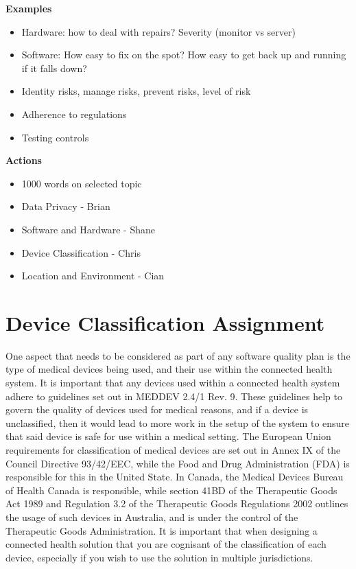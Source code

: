 \textbf{Examples}
\begin{itemize}
\item Hardware: how to deal with repairs? Severity (monitor vs server)
\item Software: How easy to fix on the spot? How easy to get back up and running if it falls down?
\item Identity risks, manage risks, prevent risks, level of risk
\item Adherence to regulations
\item Testing controls
\end{itemize}

\textbf{Actions}
\begin{itemize}
\item 1000 words on selected topic
\item Data Privacy - Brian
\item Software and Hardware - Shane
\item Device Classification - Chris
\item Location and Environment - Cian
\end{itemize}

\section{Device Classification Assignment}

One aspect that needs to be considered as part of any software quality plan is the type of medical devices being used, and their use within the connected health system. It is important that any devices used within a connected health system adhere to guidelines set out in MEDDEV 2.4/1 Rev. 9. These guidelines help to govern the quality of devices used for medical reasons, and if a device is unclassified, then it would lead to more work in the setup of the system to ensure that said device is safe for use within a medical setting. The European Union requirements for classification of medical devices are set out in Annex IX of the Council Directive 93/42/EEC, while the Food and Drug Administration (FDA) is responsible for this in the United State. In Canada, the Medical Devices Bureau of Health Canada is responsible, while section 41BD of the Therapeutic Goods Act 1989 and Regulation 3.2 of the Therapeutic Goods Regulations 2002 outlines the usage of such devices in Australia, and is under the control of the Therapeutic Goods Administration. It is important that when designing a connected health solution that you are cognisant of the classification of each device, especially if you wish to use the solution in multiple jurisdictions. 

